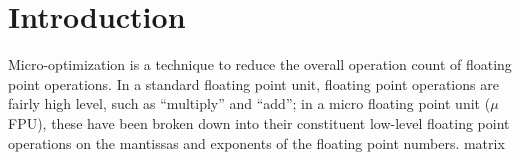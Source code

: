 \chapter{Introduction}

Micro-optimization is a technique to reduce the overall operation count of
floating point operations.  In a standard floating point unit, floating
point operations are fairly high level, such as ``multiply'' and ``add'';
in a micro floating point unit ($\mu$FPU), these have been broken down into
their constituent low-level floating point operations on the mantissas and
exponents of the floating point numbers.
\Gls{matrix}

\nocite{*}
